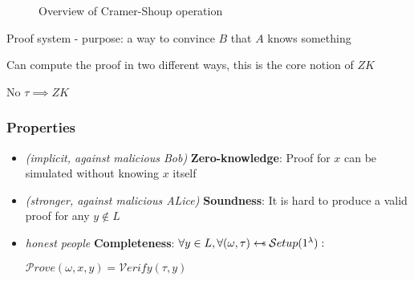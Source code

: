 \begin{figure}[h!]
    \centering
    \sdinit{}
    \caption{Overview of Cramer-Shoup operation}
    \label{seq:csoverview}
\end{figure}

Proof system - purpose: a way to convince $B$ that $A$ knows something

Can compute the proof in two different ways, this is the core notion of $ZK$

No $\tau \implies ZK$

\subsubsection{Properties}

\begin{itemize}
    \item \textit{(implicit, against malicious Bob)} \textbf{Zero-knowledge}: Proof for $x$ can be simulated without knowing $x$ itself
    \item \textit{(stronger, against malicious ALice)} \textbf{Soundness}: It is hard to produce a valid proof for any $y \notin L$
    \item \textit{honest people} \textbf{Completeness}: $\forall y \in L, \forall (\omega, \tau) \pickUAR \mathcal{S}etup(1^\lambda):$
    
    $\mathcal{P}rove(\omega, x, y) = \mathcal{V}erify(\tau, y)$
\end{itemize}